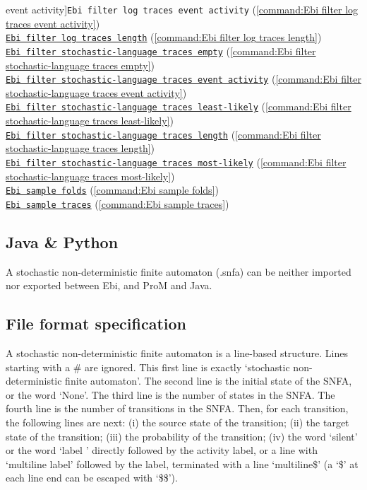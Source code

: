 {event activity]{\texttt{Ebi filter log traces event activity}} (\cref{command:Ebi filter log traces event activity})\\\null\qquad\hyperref[command:Ebi filter log traces length]{\texttt{Ebi filter log traces length}} (\cref{command:Ebi filter log traces length})\\\null\qquad\hyperref[command:Ebi filter stochastic-language traces empty]{\texttt{Ebi filter stochastic-language traces empty}} (\cref{command:Ebi filter stochastic-language traces empty})\\\null\qquad\hyperref[command:Ebi filter stochastic-language traces event activity]{\texttt{Ebi filter stochastic-language traces event activity}} (\cref{command:Ebi filter stochastic-language traces event activity})\\\null\qquad\hyperref[command:Ebi filter stochastic-language traces least-likely]{\texttt{Ebi filter stochastic-language traces least-likely}} (\cref{command:Ebi filter stochastic-language traces least-likely})\\\null\qquad\hyperref[command:Ebi filter stochastic-language traces length]{\texttt{Ebi filter stochastic-language traces length}} (\cref{command:Ebi filter stochastic-language traces length})\\\null\qquad\hyperref[command:Ebi filter stochastic-language traces most-likely]{\texttt{Ebi filter stochastic-language traces most-likely}} (\cref{command:Ebi filter stochastic-language traces most-likely})\\\null\qquad\hyperref[command:Ebi sample folds]{\texttt{Ebi sample folds}} (\cref{command:Ebi sample folds})\\\null\qquad\hyperref[command:Ebi sample traces]{\texttt{Ebi sample traces}} (\cref{command:Ebi sample traces})
\subsection*{Java \& Python}
A stochastic non-deterministic finite automaton (.snfa) can be neither imported nor exported between Ebi, and ProM and Java.
\subsection*{File format specification}A stochastic non-deterministic finite automaton is a line-based structure. Lines starting with a \# are ignored.
    This first line is exactly `stochastic non-deterministic finite automaton'.
    The second line is the initial state of the SNFA, or the word `None'.
    The third line is the number of states in the SNFA.
    The fourth line is the number of transitions in the SNFA.
    Then, for each transition, the following lines are next: 
    (i) the source state of the transition;
    (ii) the target state of the transition;
    (iii) the probability of the transition;
    (iv) the word `silent' or the word `label ' directly followed by the activity label, or a line with `multiline label' followed by the label, terminated with a line `multiline\$' (a `\$' at each line end can be escaped with `\$\$').

}
